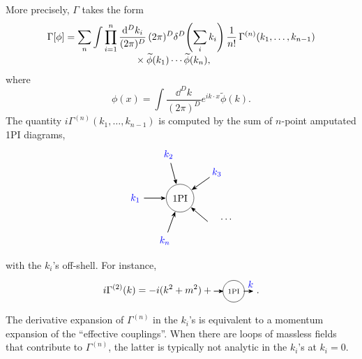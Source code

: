 More precisely, \(\Gamma\) takes the form
\[
\begin{aligned}
  \Gamma[\phi]
  &=
  \sum_n
  \int\prod_{i=1}^n\frac{\mathrm{d}^Dk_i}{(2\pi)^D}\,
  (2\pi)^D\delta^D\!\left(\sum_i k_i\right)
  \frac1{n!}\,
  \Gamma^{(n)}(k_1,\ldots,k_{n-1})
\\[-0.3em]
  &\hspace{7.2em}\times
  \widetilde\phi(k_1)\cdots\widetilde\phi(k_n),
\end{aligned}
\]
where
\[
  \phi(x)
  =
  \int\frac{\dd^Dk}{(2\pi)^D}e^{ik\cdot x}\widetilde\phi(k).
\]
The quantity \(i\Gamma^{(n)}(k_1,\ldots,k_{n-1})\) is computed by the sum
of \(n\)-point amputated 1PI diagrams,
\[
\begin{tikzpicture}[>=Stealth,scale=0.9]
  \node[circle,draw,minimum size=1.0cm] (v) at (0,0) {1PI};
  \foreach \a/\lab in {35/{k_3},105/{k_2},180/{k_1},250/{k_n},320/{}} {
    \draw[->,line width=0.65pt] (\a:1.45) -- (v);
    \node[blue] at (\a:1.8) {\(\lab\)};
  }
  \node at (1.85,-0.85) {\(\cdots\)};
\end{tikzpicture}
\]
with the \(k_i\)'s off-shell.  For instance,
\[
  i\Gamma^{(2)}(k)
  =
  -i(k^2+m^2)
  +
  \begin{tikzpicture}[baseline=-0.45ex,scale=0.72,>=Stealth]
    \draw[->,line width=0.65pt] (-1.0,0) -- (-0.5,0);
    \node[circle,draw,minimum size=0.75cm] at (0,0) {\scriptsize 1PI};
    \draw[->,line width=0.65pt] (0.5,0) -- (1.0,0);
    \node[blue] at (0.85,0.35) {\(k\)};
  \end{tikzpicture}.
\]

The derivative expansion of \(\Gamma^{(n)}\) in the \(k_i\)'s is
equivalent to a momentum expansion of the ``effective couplings''.  When
there are loops of massless fields that contribute to \(\Gamma^{(n)}\),
the latter is typically not analytic in the \(k_i\)'s at \(k_i=0\).

